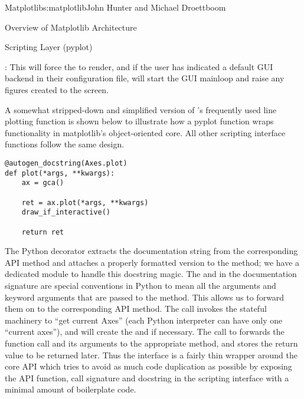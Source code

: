 \begin{aosachapter}{Matplotlib}{s:matplotlib}{John Hunter and Michael Droettboom}
\begin{aosasect1}{Overview of Matplotlib Architecture}
\begin{aosasect2}{Scripting Layer (pyplot)}
\begin{aosaitemize}
\item {}: This will force the  to render,
  and if the user has indicated a default GUI backend in their
  configuration file, will start the GUI mainloop and raise any
  figures created to the screen.

\end{aosaitemize}

A somewhat stripped-down and simplified version of 's
frequently used line plotting function 
is shown below to illustrate how a pyplot function wraps functionality
in matplotlib's object-oriented core.  All other  scripting
interface functions follow the same design.

\begin{verbatim}
@autogen_docstring(Axes.plot)
def plot(*args, **kwargs):
    ax = gca()

    ret = ax.plot(*args, **kwargs)
    draw_if_interactive()

    return ret
\end{verbatim}

The Python decorator  extracts
the documentation string from the corresponding API method and
attaches a properly formatted version to the 
method; we have a dedicated module  to
handle this docstring magic.  The  and  in
the documentation signature are special conventions in Python to mean
all the arguments and keyword arguments that are passed to the method.
This allows us to forward them on to the corresponding API method.
The call  invokes the stateful machinery to ``get
current Axes'' (each Python interpreter can have only one ``current
axes''), and will create the  and  if
necessary.  The call to  forwards
the function call and its arguments to the appropriate 
method, and stores the return value to be returned later.  Thus the
 interface is a fairly thin wrapper around the core
 API which tries to avoid as much code duplication as
possible by exposing the API function, call signature and docstring in
the scripting interface with a minimal amount of boilerplate code.

\end{aosasect2}

\end{aosasect1}


\end{aosachapter}
